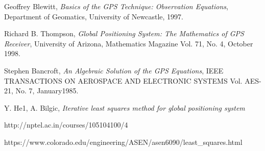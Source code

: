 \documentclass[]{mwart}
\theoremstyle{definition}
\begin{document}

\begin{thebibliography}{9}

  Geoffrey Blewitt,
  \textit{Basics of the GPS Technique: Observation Equations},
  Department of Geomatics, University of Newcastle,
  1997.

  Richard B. Thompson,
  \textit{Global Positioning System: The Mathematics of GPS Receiver},
  University of Arizona, Mathematics Magazine
  Vol. 71, No. 4, October 1998.

  Stephen Bancroft,
  \textit{An Algebraic Solution of the GPS Equations},
  IEEE TRANSACTIONS ON AEROSPACE AND ELECTRONIC SYSTEMS Vol. AES-21, No. 7, January1985.

  Y. He1, A. Bilgic,
  \textit{Iterative least squares method for global positioning system}

	http://nptel.ac.in/courses/105104100/4

	https://www.colorado.edu/engineering/ASEN/asen6090/least_squares.html



\end{thebibliography}
\end{document}

